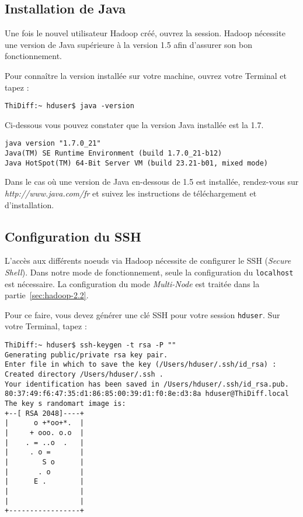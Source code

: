 \subsection{Installation de Java}

\par Une fois le nouvel utilisateur Hadoop créé, ouvrez la session. Hadoop nécessite une version de Java supérieure à la version 1.5 afin d'assurer son bon fonctionnement. 

\par Pour connaître la version installée sur votre machine, ouvrez votre Terminal et tapez :

\begin{verbatim}
ThiDiff:~ hduser$ java -version
\end{verbatim}

\par Ci-dessous vous pouvez constater que la version Java installée est la 1.7.

\begin{verbatim}
java version "1.7.0_21"
Java(TM) SE Runtime Environment (build 1.7.0_21-b12)
Java HotSpot(TM) 64-Bit Server VM (build 23.21-b01, mixed mode)
\end{verbatim}

\par Dans le cas où une version de Java en-dessous de 1.5 est installée, rendez-vous sur \textit{http://www.java.com/fr} et suivez les instructions de téléchargement et d'installation.

\subsection{Configuration du SSH}

\par L'accès aux différents noeuds via Hadoop nécessite de configurer le SSH (\textit{Secure Shell}). Dans notre mode de fonctionnement, seule la configuration du \texttt{localhost} est nécessaire. La configuration du mode \textit{Multi-Node} est traitée dans la partie~\ref{sec:hadoop-2.2}.

\par Pour ce faire, vous devez générer une clé SSH pour votre session \texttt{hduser}. Sur votre Terminal, tapez :

\begin{verbatim}
ThiDiff:~ hduser$ ssh-keygen -t rsa -P ""
Generating public/private rsa key pair.
Enter file in which to save the key (/Users/hduser/.ssh/id_rsa) :
Created directory /Users/hduser/.ssh .
Your identification has been saved in /Users/hduser/.ssh/id_rsa.pub.
80:37:49:f6:47:35:d1:86:85:00:39:d1:f0:8e:d3:8a hduser@ThiDiff.local
The key s randomart image is:
+--[ RSA 2048]----+
|      o +*oo+*.  |
|     + ooo. o.o  |
|    . = ..o  .   |
|     . o =       |
|        S o      |
|       . o       |
|      E .        |
|                 |
|                 |
+-----------------+
\end{verbatim}

